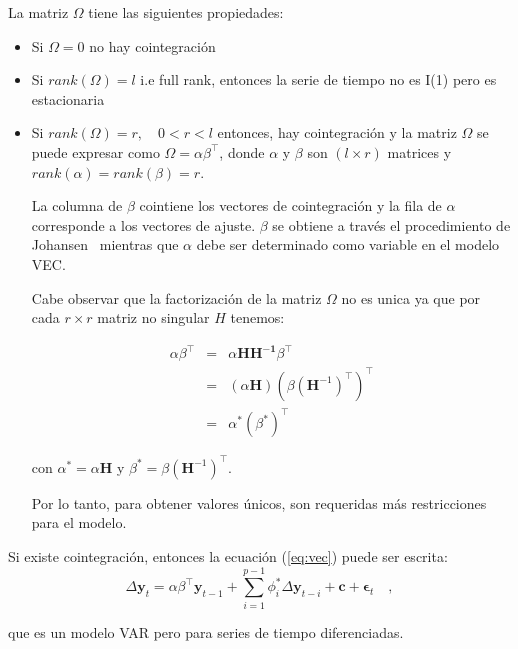     La matriz $\Omega$ tiene las siguientes propiedades:
    \begin{itemize}
    \item Si $\Omega = 0$ no hay cointegración 
    \item Si $rank(\Omega)=l$ i.e full rank, entonces la serie de tiempo no es I(1) pero es estacionaria
    \item Si $rank(\Omega)=r,\quad 0 < r < l$ entonces, hay cointegración 
    y la matriz $\Omega$ se puede expresar como $\Omega =
    \alpha \beta^\intercal$, donde $\alpha$ y $\beta$ son $(l \times r)$
    matrices y $rank(\alpha)=rank(\beta)=r$.

    La columna de $\beta$ cointiene los vectores de cointegración y la fila de
    $\alpha$ corresponde a los vectores de ajuste. $\beta$ se obtiene a través
    el procedimiento de Johansen~\cite{johansen1988} mientras que $\alpha$ debe
    ser determinado como variable en el modelo VEC.

    Cabe observar que la factorización de la matriz $\Omega$ no es unica ya que por cada
    $r \times r$ matriz no singular $H$ tenemos:

\begin{eqnarray*}
\alpha \beta^\intercal &=& \alpha \mathbf{HH^{-1}} \beta^\intercal\\
&=&(\alpha\mathbf{H})(\beta(\mathbf{H}^{-1})^\intercal)^\intercal \\
&=& \alpha^*(\beta^*)^\intercal
\end{eqnarray*}

\noindent con $\alpha^* = \alpha\mathbf{H}$ y $\beta^* =
\beta(\mathbf{H}^{-1})^\intercal$.

Por lo tanto, para obtener valores únicos, son requeridas más restricciones
para el modelo.

\end{itemize}

Si existe cointegración, entonces la ecuación (\ref{eq:vec}) puede ser escrita:
\begin{equation}
 \label{eq:vecfull}
  \Delta \mathbf{y}_t = \alpha \beta^\intercal\mathbf{y}_{t-1} 
   + \sum_{i=1}^{p-1} \phi_i^*\Delta
   \mathbf{y}_{t-i}  + \mathbf{c} + \mathbf{\epsilon}_t \quad ,
   \end{equation}

   \noindent que es un modelo VAR pero para series de tiempo diferenciadas.

